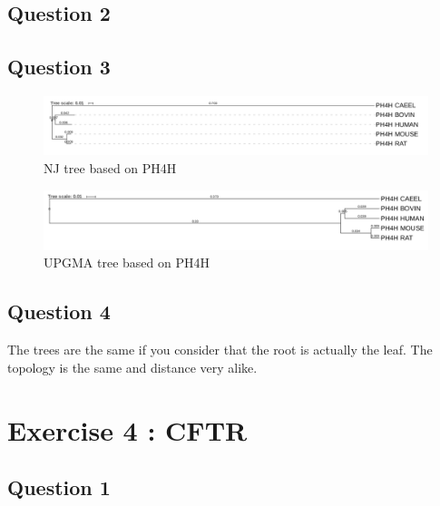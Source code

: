 \documentclass[]{article}
\begin{document}
\subsection{Question 2}

\subsection{Question 3}
\begin{figure}[h]
\includegraphics*[width = \linewidth]{NJ_PH4H.pdf}
\caption{NJ tree based on PH4H}
\end{figure}
\begin{figure}[h]
	\includegraphics*[width = \linewidth]{UPGMA_PH4H.pdf}
	\caption{UPGMA tree based on PH4H}
\end{figure}

\subsection{Question 4}
The trees are the same if you consider that the root is actually the leaf. The topology is the same and distance very alike.


\section{Exercise 4 : CFTR}
\subsection{Question 1}

\newpage
\end{document}
